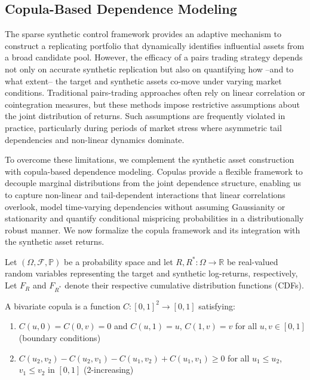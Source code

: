 \subsection{Copula-Based Dependence Modeling}

The sparse synthetic control framework provides an adaptive mechanism to construct a replicating portfolio that dynamically identifies influential assets from a broad candidate pool. However, the efficacy of a pairs trading strategy depends not only on accurate synthetic replication but also on quantifying how --and to what extent-- the target and synthetic assets co-move under varying market conditions. 
%
Traditional pairs-trading approaches often rely on linear correlation or cointegration measures, but these methods impose restrictive assumptions about the joint distribution of returns. Such assumptions are frequently violated in practice, particularly during periods of market stress where asymmetric tail dependencies and non-linear dynamics dominate.

To overcome these limitations, we complement the synthetic asset construction with copula-based dependence modeling. Copulas provide a flexible framework to decouple marginal distributions from the joint dependence structure, enabling us to capture non-linear and tail-dependent interactions that linear correlations overlook, model time-varying dependencies without assuming Gaussianity or stationarity and quantify conditional mispricing probabilities in a distributionally robust manner.
%
We now formalize the copula framework and its integration with the synthetic asset returns.

Let $(\Omega, \mathcal{F}, \mathbb{P})$ be a probability space and let $R, R^*: \Omega \to \mathbb{R}$ be real-valued random variables representing the target and synthetic log-returns, respectively, 
Let $F_R$ and $F_{R^*}$ denote their respective cumulative distribution functions (CDFs).

\begin{definition}[Copula]
A bivariate copula is a function $C: [0,1]^2 \to [0,1]$ satisfying:
\begin{enumerate}
   \item $C(u,0) = C(0,v) = 0$ and $C(u,1) = u$, $C(1,v) = v$ for all $u,v \in [0,1]$ (boundary conditions)
   \item $C(u_2,v_2) - C(u_2,v_1) - C(u_1,v_2) + C(u_1,v_1) \geq 0$ for all $u_1 \leq u_2$, $v_1 \leq v_2$ in $[0,1]$ (2-increasing)
\end{enumerate}
\end{definition}

